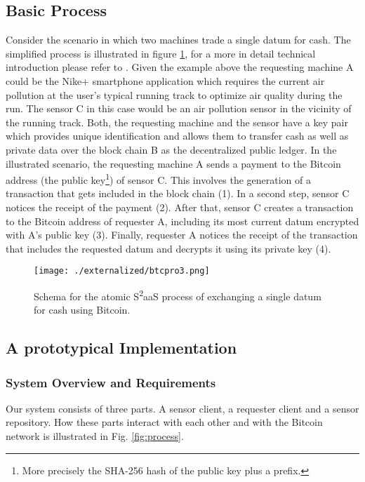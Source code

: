 \subsection{Basic Process}
Consider the scenario in which two machines trade a single datum for cash. The simplified process is illustrated in figure \ref{fig:btcDataExchange}, for a more in detail technical introduction please refer to \cite{bitcoinwiki, nakamoto2008bitcoin}. Given the example above the requesting machine A could be the Nike+ smartphone application which requires the current air pollution at the user's typical running track to optimize air quality during the run. The sensor C in this case would be an air pollution sensor in the vicinity of the running track. Both, the requesting machine and the sensor have a key pair which provides unique identification and allows them to transfer cash as well as private data over the block chain B as the decentralized public ledger. 
In the illustrated scenario, the requesting machine A sends a payment to the Bitcoin address (the public key\footnote{More precisely the SHA-256 hash of the public key plus a prefix.}) of sensor C. This involves the generation of a transaction that gets included in the block chain (1). In a second step, sensor C notices the receipt of the payment (2). After that, sensor C creates a transaction to the Bitcoin address of requester A, including its most current datum encrypted with A's public key  (3). Finally, requester A notices the receipt of the transaction that includes the requested datum and decrypts it using its private key (4).

\begin{figure}
\centering
\texttt{[image: ./externalized/btcpro3.png]}
\caption{Schema for the atomic  S\textsuperscript{2}aaS process of exchanging a single datum for cash using Bitcoin.}
\label{fig:btcDataExchange}
\end{figure}

\subsection{A prototypical Implementation}

\subsubsection{System Overview and Requirements}

Our system consists of three parts. A sensor client, a requester client and a sensor repository. How these parts interact with each other and with the Bitcoin network is illustrated in Fig. \ref{fig:process}.

